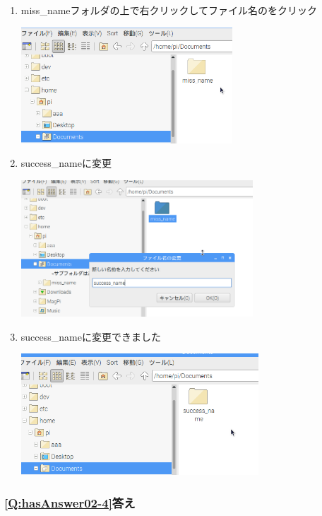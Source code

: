 \documentclass[a4paper,12pt]{jarticle}
\begin{document}
\begin{enumerate}
  \item
        miss\_nameフォルダの上で右クリックしてファイル名のをクリック

        \centering
        \includegraphics[width=7.913cm,height=4.344cm]{textbook-img214.png}
        \flushleft

  \item success\_nameに変更

        \centering
        \includegraphics[width=8.694cm,height=5.115cm]{textbook-img215.png}
        \flushleft
  \item success\_nameに変更できました

        \centering
        \includegraphics[width=8.895cm,height=4.542cm]{textbook-img216.png}
        \flushleft
\end{enumerate}



\subsubsection{\bfseries
\ref*{Q:hasAnswer02-4}答え}
\end{document}
